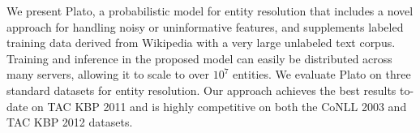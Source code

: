 We present Plato, a probabilistic model for entity resolution that includes a novel approach for handling noisy or uninformative features, and supplements labeled training data derived from Wikipedia with a very large unlabeled text corpus. Training and inference in the proposed model can easily be distributed across many servers, allowing it to scale to over $10^7$ entities. We evaluate Plato on three standard datasets for entity resolution. Our approach achieves the best results to-date on TAC KBP 2011 and is highly competitive on both the CoNLL 2003 and TAC KBP 2012 datasets.
